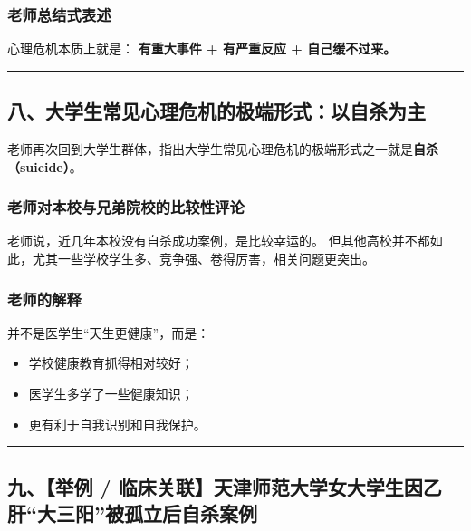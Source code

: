 \documentclass[
  chinese,
  9pt,
  a4paper,
]{ctexart}
\providecommand{\tightlist}{%
  \setlength{\itemsep}{0pt}\setlength{\parskip}{0pt}}
\begin{document}
\subsubsection{老师总结式表述}\label{ux8001ux5e08ux603bux7ed3ux5f0fux8868ux8ff0}

心理危机本质上就是： \textbf{有重大事件 + 有严重反应 + 自己缓不过来。}

\begin{center}\rule{0.5\linewidth}{0.5pt}\end{center}

\subsection{八、大学生常见心理危机的极端形式：以自杀为主}\label{ux516bux5927ux5b66ux751fux5e38ux89c1ux5fc3ux7406ux5371ux673aux7684ux6781ux7aefux5f62ux5f0fux4ee5ux81eaux6740ux4e3aux4e3b}

老师再次回到大学生群体，指出大学生常见心理危机的极端形式之一就是\textbf{自杀（suicide）}。

\subsubsection{老师对本校与兄弟院校的比较性评论}\label{ux8001ux5e08ux5bf9ux672cux6821ux4e0eux5144ux5f1fux9662ux6821ux7684ux6bd4ux8f83ux6027ux8bc4ux8bba}

老师说，近几年本校没有自杀成功案例，是比较幸运的。
但其他高校并不都如此，尤其一些学校学生多、竞争强、卷得厉害，相关问题更突出。

\subsubsection{老师的解释}\label{ux8001ux5e08ux7684ux89e3ux91ca}

并不是医学生``天生更健康''，而是：

\begin{itemize}
\tightlist
\item
  学校健康教育抓得相对较好；
\item
  医学生多学了一些健康知识；
\item
  更有利于自我识别和自我保护。
\end{itemize}

\begin{center}\rule{0.5\linewidth}{0.5pt}\end{center}

\subsection{九、【举例 /
临床关联】天津师范大学女大学生因乙肝``大三阳''被孤立后自杀案例}\label{ux4e5dux4e3eux4f8b-ux4e34ux5e8aux5173ux8054ux5929ux6d25ux5e08ux8303ux5927ux5b66ux5973ux5927ux5b66ux751fux56e0ux4e59ux809dux5927ux4e09ux9633ux88abux5b64ux7acbux540eux81eaux6740ux6848ux4f8b}
\end{document}
